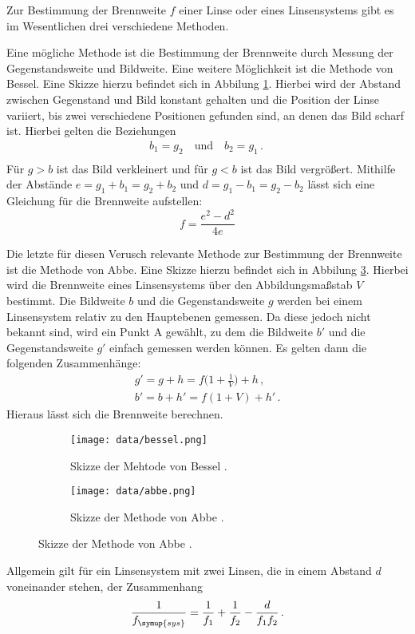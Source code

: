 Zur Bestimmung der Brennweite $f$ einer Linse oder eines Linsensystems gibt es im
Wesentlichen drei verschiedene Methoden.

Eine mögliche Methode ist die Bestimmung der Brennweite durch Messung der Gegenstandsweite
und Bildweite.
Eine weitere Möglichkeit ist die Methode von Bessel. Eine Skizze hierzu befindet sich in
Abbilung \ref{fig:bessel}. Hierbei wird der Abstand zwischen
Gegenstand und Bild konstant gehalten und die Position der Linse variiert, bis zwei
verschiedene Positionen gefunden sind, an denen das Bild scharf ist. Hierbei gelten die
Beziehungen
\begin{align}
  b_1=g_2 \quad \text{und} \quad b_2=g_1\,.\ \\
  \label{eqn:d}
\end{align}
Für $g>b$ ist das Bild verkleinert und für $g<b$ ist das Bild vergrößert. Mithilfe der
Abstände $e=g_1+b_1=g_2+b_2$ und $d=g_1-b_1=g_2-b_2$ lässt sich eine Gleichung für die
Brennweite aufstellen:
\begin{equation}
  f=\frac{e^2-d^2}{4e}
  \label{eqn:bessel}
\end{equation}

Die letzte für diesen Verusch relevante Methode zur Bestimmung der Brennweite ist
die Methode von Abbe. Eine Skizze hierzu befindet sich in Abbilung \ref{fig:abbe}.
Hierbei wird die Brennweite eines Linsensystems über den Abbildungsmaßstab $V$ bestimmt.
Die Bildweite $b$ und die Gegenstandsweite $g$ werden bei einem Linsensystem relativ zu den
Hauptebenen gemessen. Da diese jedoch nicht bekannt sind, wird ein Punkt A gewählt, zu dem
die Bildweite $b'$ und die Gegenstandsweite $g'$ einfach gemessen werden können. Es
gelten dann die folgenden Zusammenhänge:
\begin{align}
  g'=g+h=f\biggl(1+\frac{1}{V}\biggr)+h \,,\\
  b'=b+h'=f(1+V)+h'\,.
\end{align}
Hieraus lässt sich die Brennweite berechnen.

\begin{figure}
  \centering
  \begin{subfigure}{0.48\textwidth}
    \texttt{[image: data/bessel.png]}
    \caption{Skizze der Mehtode von Bessel \cite{Versuchsanleitung}.}
    \label{fig:bessel}
  \end{subfigure}
  \begin{subfigure}{0.48\textwidth}
    \centering
    \texttt{[image: data/abbe.png]}
    \caption{Skizze der Methode von Abbe \cite{Versuchsanleitung}.}
    \label{fig:abbe}
  \end{subfigure}
\end{figure}

Allgemein gilt für ein Linsensystem mit zwei Linsen, die in einem Abstand $d$
voneinander stehen, der Zusammenhang
\begin{equation}
  \frac{1}{f_{\symup{sys}}}=\frac{1}{f_1}+\frac{1}{f_2}-\frac{d}{f_1 f_2} \,.
  \label{eqn:system}
\end{equation}
